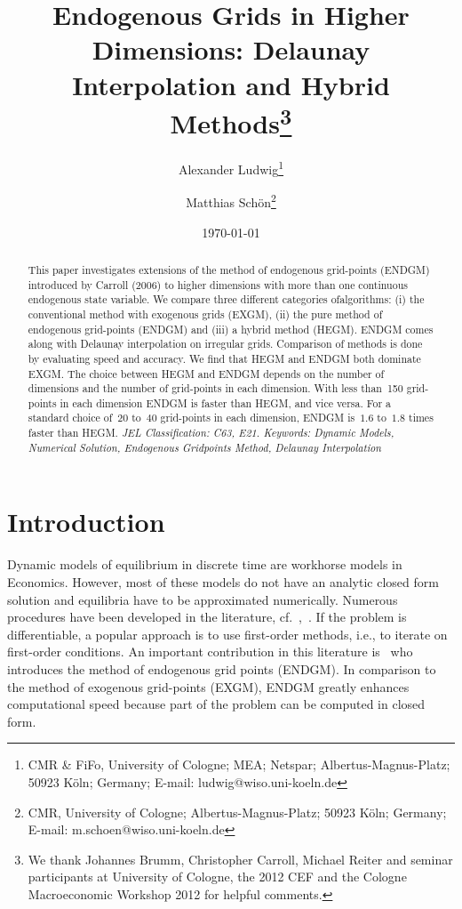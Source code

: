 \documentclass[a4paper,12pt]{article}
\begin{document}
\title{Endogenous Grids in Higher Dimensions: Delaunay Interpolation and Hybrid Methods\thanks{We thank Johannes Brumm, Christopher Carroll, Michael Reiter and seminar participants at University of Cologne, the 2012 CEF and the Cologne Macroeconomic Workshop 2012 for helpful comments.}}
\author{Alexander Ludwig\thanks{CMR \& FiFo, University of Cologne; MEA; Netspar; Albertus-Magnus-Platz; 50923 K\"oln; Germany; E-mail: ludwig@wiso.uni-koeln.de}
\and Matthias Sch\"{o}n\thanks{CMR, University of Cologne; Albertus-Magnus-Platz; 50923 K\"{o}ln; Germany; E-mail: m.schoen@wiso.uni-koeln.de}}
\date{\today }
\maketitle

\begin{abstract}
This paper investigates extensions of the method of endogenous grid-points (ENDGM) introduced by Carroll (2006) to higher dimensions with more than one continuous endogenous state variable. We compare three different categories ofalgorithms: (i) the conventional method with exogenous grids (EXGM), (ii) the pure method of endogenous grid-points (ENDGM) and (iii) a hybrid method (HEGM). ENDGM comes along with Delaunay interpolation on irregular grids. Comparison of methods is done by evaluating speed and accuracy. We find that HEGM and ENDGM both dominate EXGM. The choice between HEGM and ENDGM depends on the number of dimensions and the number of grid-points in each dimension. With less than~150 grid-points in each dimension ENDGM is faster than HEGM, and vice versa. For a standard choice of~$20$ to~$40$ grid-points in each dimension, ENDGM is~$1.6$ to~$1.8$ times faster than HEGM. 
\newline\textit{JEL Classification: C63, E21.
\newline Keywords: Dynamic Models, Numerical Solution, Endogenous Gridpoints Method, Delaunay Interpolation}

\end{abstract}

\newpage
{} 
\renewcommand{\thefootnote}{\arabic{footnote}} 
\setcounter{footnote}{0}

\section{Introduction}

Dynamic models of equilibrium in discrete time are workhorse models in Economics. However, most of these models do not have an analytic closed form solution and equilibria have to be approximated numerically. Numerous procedures have been developed in the literature, cf.~,~. If the problem is differentiable, a popular approach is to use first-order methods, i.e., to iterate on first-order conditions. An important contribution in this literature is~ who introduces the method of endogenous grid points (ENDGM). In comparison to the method of exogenous grid-points (EXGM), ENDGM greatly enhances computational speed because part of the problem can be computed in closed form.
\end{document}
